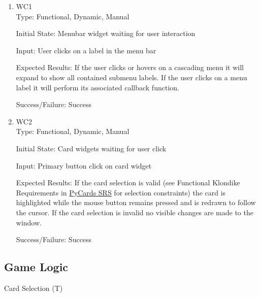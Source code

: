 \documentclass[12pt, titlepage]{article}
\newcounter{tnum}
\newcommand{\tthetnum}{T\thetnum}
\begin{document}
	\begin{enumerate}
		\item{WC1\\}
		Type: Functional, Dynamic, Manual
		
		Initial State: Menubar widget waiting for user interaction
		
		Input: User clicks on a label in the menu bar
		
		Expected Results: If the user clicks or hovers on a cascading menu it will expand
		to show all contained submenu labels. If the user clicks on a menu label
		it will perform its associated callback function.

		Success/Failure: Success

		\item{WC2\\}
		Type: Functional, Dynamic, Manual
		
		Initial State: Card widgets waiting for user click
		
		Input: Primary button click on card widget
		
		Expected Results: If the card selection is valid (see Functional Klondike Requirements in 
		\href{https://gitlab.cas.mcmaster.ca/premaa/pysol/tree/master/Doc/SRS}
		{PyCards SRS} for selection constraints) the card is highlighted while the
		mouse button remains pressed and is redrawn to follow the cursor. If the card
		selection is invalid no visible changes are made to the window.

		Success/Failure: Success
	\end{enumerate}
	\subsection{Game Logic}
	
	\begin{description}
		\item[Card Selection (\tthetnum \label{tCard})]
	\end{description}
	
\end{document}
